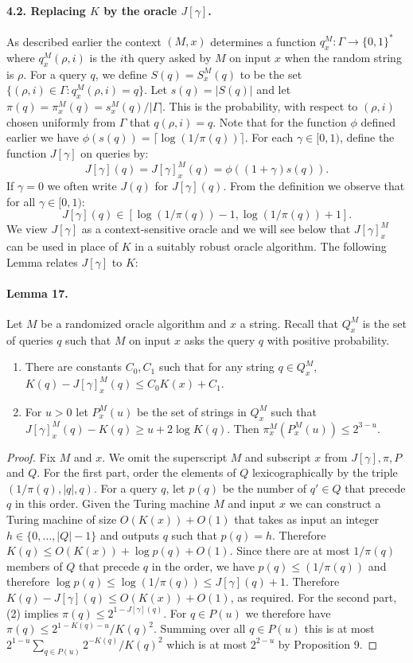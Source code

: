 \paragraph{4.2. Replacing $K$ by the oracle $J[\gamma]$.}
As described earlier the context $(M,x)$ determines a function $q_x^M:\Gamma\to\{0,1\}^*$ where $q_x^M(\rho,i)$ is the $i$th query asked by $M$ on input $x$ when the random string is $\rho$.
For a query $q$, we define $S(q)=S_x^M(q)$ to be the set $\{(\rho,i)\in\Gamma:q_x^M(\rho,i)=q\}$.
Let $s(q)=|S(q)|$ and let $\pi(q)=\pi_x^M(q)=s_x^M(q)/|\Gamma|$. This is the probability, with respect to $(\rho,i)$ chosen uniformly from $\Gamma$ that $q(\rho,i)=q$. Note that for the function $\phi$ defined earlier we have $\phi(s(q))=\lceil\log(1/\pi(q))\rceil$.
For each $\gamma\in[0,1)$, define the function $J[\gamma]$ on queries by:
\[J[\gamma](q)=J[\gamma]_x^M(q)=\phi((1+\gamma)s(q)).\]
If $\gamma=0$ we often write $J(q)$ for $J[\gamma](q)$. From the definition we observe that for all $\gamma\in[0,1)$:
\[J[\gamma](q)\in[\log(1/\pi(q))-1,\log(1/\pi(q))+1].\tag{2}\]
We view $J[\gamma]$ as a context-sensitive oracle and we will see below that $J[\gamma]_x^M$ can be used in place of $K$ in a suitably robust oracle algorithm. The following Lemma relates $J[\gamma]$ to $K$:
\paragraph{Lemma 17.}
Let $M$ be a randomized oracle algorithm and $x$ a string. Recall that $Q_x^M$ is the set of queries $q$ such that $M$ on input $x$ asks the query $q$ with positive probability.
\begin{enumerate}
\item There are constants $C_0,C_1$ such that for any string $q\in Q_x^M$, $K(q)-J[\gamma]_x^M(q)\leq C_0K(x)+C_1$.
\item For $u>0$ let $P_x^M(u)$ be the set of strings in $Q_x^M$ such that $J[\gamma]_x^M(q)-K(q)\geq u+2\log K(q)$. Then $\pi_x^M(P_x^M(u))\leq2^{3-u}$.
\end{enumerate}
\begin{proof}
Fix $M$ and $x$. We omit the superscript $M$ and subscript $x$ from $J[\gamma],\pi,P$ and $Q$.
For the first part, order the elements of $Q$ lexicographically by the triple $(1/\pi(q),|q|,q)$. For a query $q$, let $p(q)$ be the number of $q'\in Q$ that precede $q$ in this order. Given the Turing machine $M$ and input $x$ we can construct a Turing machine of size $O(K(x))+O(1)$ that takes as input an integer $h\in\{0,\ldots,|Q|-1\}$ and outputs $q$ such that $p(q)=h$.
Therefore $K(q)\leq O(K(x))+\log p(q)+O(1)$. Since there are at most $1/\pi(q)$ members of $Q$ that precede $q$ in the order, we have $p(q)\leq(1/\pi(q))$ and therefore $\log p(q)\leq\log(1/\pi(q))\leq J[\gamma](q)+1$. Therefore $K(q)-J[\gamma](q)\leq O(K(x))+O(1)$, as required.
For the second part, (2) implies $\pi(q)\leq2^{1-J[\gamma](q)}$. For $q\in P(u)$ we therefore have $\pi(q)\leq2^{1-K(q)-u}/K(q)^2$. Summing over all $q\in P(u)$ this is at most $2^{1-u}\sum_{q\in P(u)}2^{-K(q)}/K(q)^2$ which is at most $2^{2-u}$ by Proposition 9.
\end{proof}
